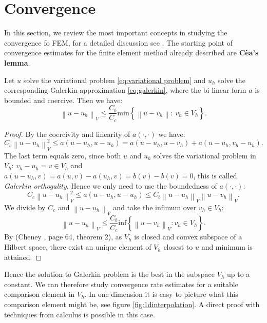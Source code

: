 \documentclass[../Main/main.tex]{subfiles}
\begin{document}
	\section*{Convergence}
	
	In this section, we review the most important concepts in studying the convergence fo FEM, for a detailed discussion see \cite{Knabner}.
	The starting point of convergence estimates for the finite element method already described are \textbf{Cèa's lemma}. 
	\begin{theorem}
		Let $u$ solve the variational problem \eqref{eq:variational problem} and $u_h$ solve the corresponding Galerkin approximation \eqref{eq:galerkin}, where the bi linear form $a$ is bounded and coercive. Then we have:
		\begin{equation}
			\left \| u-u_h \right \|_V \leq \frac{C_b}{C_c}\text{min} \left \{ \left \| u-v_h \right \|: \ v_h \in V_h \right \}.
		\end{equation}
		
	\end{theorem}
	\begin{proof}
		By the coercivity and linearity of $a(\cdot,\cdot)$ we have:
		\begin{equation*}
			C_c \left \| u-u_h \right \|^2_V \leq a(u-u_h,u-u_h) = a(u-u_h,u-v_h) + a(u-u_h, v_h - u_h).
		\end{equation*}
		The last term equals zero, since both $u$ and $u_h$ solves the variational problem in $V_h$: $v_h-u_h = v \in V_h$ and $a(u-u_h,v) = a(u,v)-a(u_h,v) = b(v)-b(v) = 0$, this is called \emph{Galerkin orthogality}. Hence we only need to use the boundedness of $a(\cdot,\cdot)$:
		\begin{equation*}
			C_c \left \| u-u_h \right \|^2_V \leq a(u-u_h,u-u_h) \leq C_b \left \| u-u_h \right \|_V \left \| u-v_h \right \|_V.
		\end{equation*}
		We divide by $C_c$ and $\left \| u-u_h \right \|_V$ and take the infimum over $v_h \in V_h$:
		\begin{equation*}
			\left \| u-u_h \right \|_V \leq \frac{C_b}{C_c} \text{inf} \left \{ \left \| u-v_h \right \|_V: v_h \in V_h \right \}.
		\end{equation*}
		By (Cheney \cite{Cheney}, page 64, theorem 2), as $V_h$ is closed and convex subspace of a Hilbert space, there exist an unique element of $V_h$ closest to $u$ and minimum is attained.  
	\end{proof}
	Hence the solution to Galerkin problem is the best in the subspace $V_h$ up to a constant. We can therefore study convergence rate estimates for a suitable comparison element in $V_h$. In one dimension it is easy to picture what this comparison element might be, see figure \ref{fig:1dinterpolation}. A direct proof with techniques from calculus is possible in this case.\\
\end{document}
